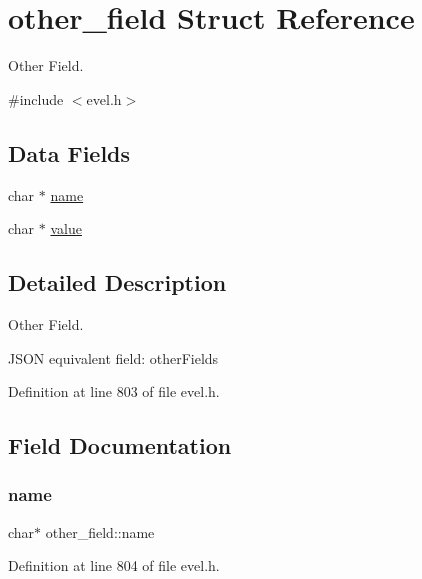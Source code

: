 \hypertarget{structother__field}{}\section{other\+\_\+field Struct Reference}
\label{structother__field}


Other Field.  




{\ttfamily \#include $<$evel.\+h$>$}

\subsection*{Data Fields}
\begin{DoxyCompactItemize}
\item 
char $\ast$ \hyperlink{structother__field_a96f8206b39daada33026000044f1af33}{name}
\item 
char $\ast$ \hyperlink{structother__field_aee8e942d925092d22e7a21dbb7b77e0c}{value}
\end{DoxyCompactItemize}


\subsection{Detailed Description}
Other Field. 

J\+S\+ON equivalent field\+: other\+Fields 

Definition at line 803 of file evel.\+h.



\subsection{Field Documentation}
\hypertarget{structother__field_a96f8206b39daada33026000044f1af33}{}\label{structother__field_a96f8206b39daada33026000044f1af33} 
\subsubsection{\texorpdfstring{name}{name}}
{\footnotesize\ttfamily char$\ast$ other\+\_\+field\+::name}



Definition at line 804 of file evel.\+h.

\hypertarget{structother__field_aee8e942d925092d22e7a21dbb7b77e0c}{}\label{structother__field_aee8e942d925092d22e7a21dbb7b77e0c} 
